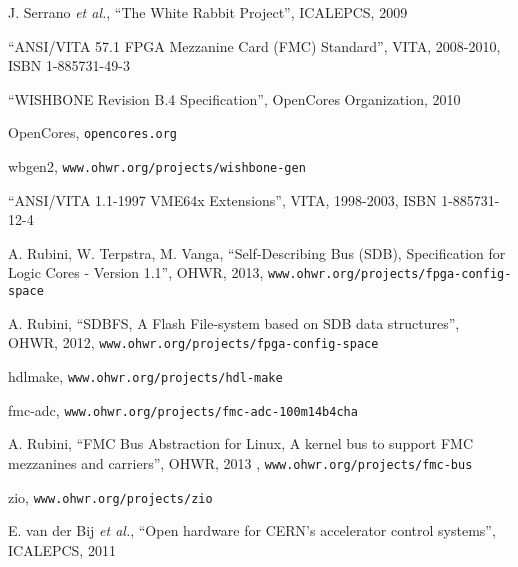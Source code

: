 \documentclass{JAC2003}
\begin{document}
\begin{thebibliography}{99} %

J. Serrano \textit{et al.}, ``The White Rabbit Project'', ICALEPCS, 2009

``ANSI/VITA 57.1 FPGA Mezzanine Card (FMC) Standard'', VITA, 2008-2010, ISBN 1-885731-49-3

``WISHBONE Revision B.4 Specification'', OpenCores Organization, 2010

OpenCores, \texttt{opencores.org}

wbgen2, \texttt{www.ohwr.org/projects/wishbone-gen}

``ANSI/VITA 1.1-1997 VME64x Extensions'', VITA, 1998-2003, ISBN 1-885731-12-4

A. Rubini, W. Terpstra, M. Vanga, ``Self-Describing Bus (SDB), Specification for Logic Cores - Version 1.1'', OHWR, 2013, \texttt{www.ohwr.org/projects/fpga-config-space}

A. Rubini, ``SDBFS, A Flash File-system based on SDB data structures'', OHWR, 2012, \texttt{www.ohwr.org/projects/fpga-config-space}

hdlmake, \texttt{www.ohwr.org/projects/hdl-make}

fmc-adc, \texttt{www.ohwr.org/projects/fmc-adc-100m14b4cha}

A. Rubini, ``FMC Bus Abstraction for Linux, A kernel bus to support FMC mezzanines and carriers'', OHWR, 2013 , \texttt{www.ohwr.org/projects/fmc-bus}

zio, \texttt{www.ohwr.org/projects/zio}

E. van der Bij \textit{et al.}, ``Open hardware for CERN's accelerator control systems'', ICALEPCS, 2011

\end{thebibliography}
\end{document}
